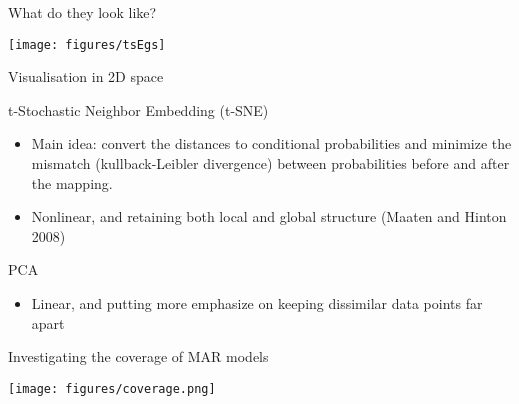 \documentclass[12pt,ignorenonframetext,compress]{beamer}
\providecommand{\tightlist}{%
  \setlength{\itemsep}{0pt}\setlength{\parskip}{0pt}}
\begin{document}
\begin{frame}{What do they look like?}
\protect\hypertarget{what-do-they-look-like}{}

\centerline{\texttt{[image: figures/tsEgs]}}

\end{frame}

\begin{frame}{Visualisation in 2D space}
\protect\hypertarget{visualisation-in-2d-space}{}

\begin{block}{t-Stochastic Neighbor Embedding (t-SNE)}

\begin{itemize}
\tightlist
\item
  Main idea: convert the distances to conditional probabilities and
  minimize the mismatch (kullback-Leibler divergence) between
  probabilities before and after the mapping.
\item
  Nonlinear, and retaining both local and global structure (Maaten and
  Hinton 2008)
\end{itemize}

\end{block}

\begin{block}{PCA}

\begin{itemize}
\tightlist
\item
  Linear, and putting more emphasize on keeping dissimilar data points
  far apart
\end{itemize}

\end{block}

\end{frame}

\begin{frame}{Investigating the coverage of MAR models}
\protect\hypertarget{investigating-the-coverage-of-mar-models}{}

\centerline{\texttt{[image: figures/coverage.png]}}

\end{frame}
\end{document}
